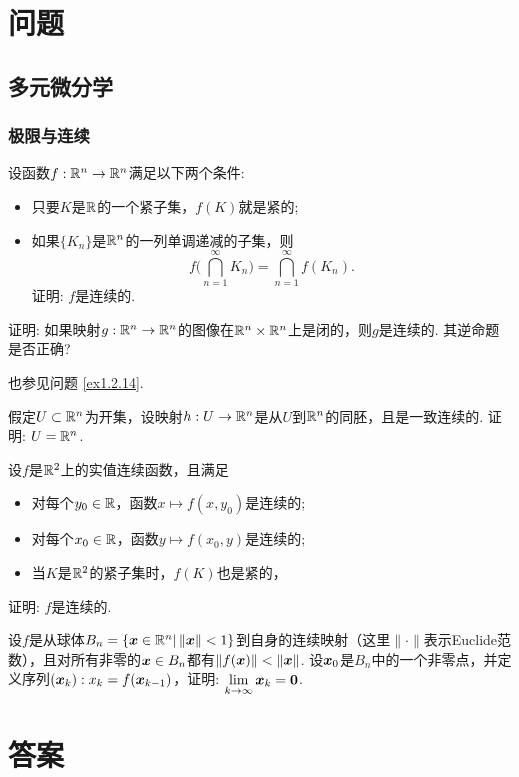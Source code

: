 \documentclass[openany,usenames,dvipsnames]{ctexbook}
\begin{document}
\pagestyle{empty}

\frontmatter
\pagestyle{fancy}
\fancyhf{}
\cfoot{\thepage}
\fancyhead[RO,LE]{\rightmark}

\tableofcontents
\mainmatter

\part{问题}


\setcounter{chapter}{1}
\chapter{多元微分学}
\section{极限与连续}
\begin{example}
  设函数$f:\mathbb R^n\to\mathbb R^n$满足以下两个条件:
  \begin{itemize}
    \item 只要$K$是$\mathbb R$的一个紧子集，$f(K)$就是紧的;
    \item 如果$\{K_n\}$是$\mathbb R^n$的一列单调递减的子集，则
    \[ f\bigg( \bigcap_{n=1}^\infty K_n \bigg)
    =\bigcap_{n=1}^\infty f(K_n). \]
    证明: $f$是连续的.
  \end{itemize}
\end{example}

\begin{example}
  证明: 如果映射$g:\mathbb R^n\to\mathbb R^n$的图像在$\mathbb R^n\times\mathbb R^n$上是闭的，则$g$是连续的. 其逆命题是否正确?
\end{example}
\begin{note}
  也参见问题 \ref{ex1.2.14}.
\end{note}

\begin{example}
  假定$U\subset \mathbb R^n$为开集，设映射$h:U\to\mathbb R^n$是从$U$到$\mathbb R^n$的同胚，且是一致连续的. 证明: $U=\mathbb R^n$.
\end{example}

\begin{example}
  设$f$是$\mathbb R^2$上的实值连续函数，且满足
  \begin{itemize}
    \item 对每个$y_0\in\mathbb R$，函数$x\mapsto f(x,y_0)$是连续的;
    \item 对每个$x_0\in\mathbb R$，函数$y\mapsto f(x_0,y)$是连续的;
    \item 当$K$是$\mathbb R^2$的紧子集时，$f(K)$也是紧的，
  \end{itemize}
  证明: $f$是连续的.
\end{example}

\begin{example}
  设$f$是从球体$B_n=\{\boldsymbol x\in\mathbb R^n|\,\|\boldsymbol x\|<1\}$到自身的连续映射（这里$\|\cdot\|$表示Euclide范数），且对所有非零的$\boldsymbol x\in B_n$都有$\|f(\boldsymbol x)\|<\|\boldsymbol x\|$. 设$\boldsymbol x_0$是$B_n$中的一个非零点，并定义序列$(\boldsymbol x_k):x_k=f(\boldsymbol x_{k-1})$，证明: $\lim_{k\to\infty}\vx_k=\zero$.
\end{example}



\part{答案}

\setcounter{chapter}{1}
\end{document}
